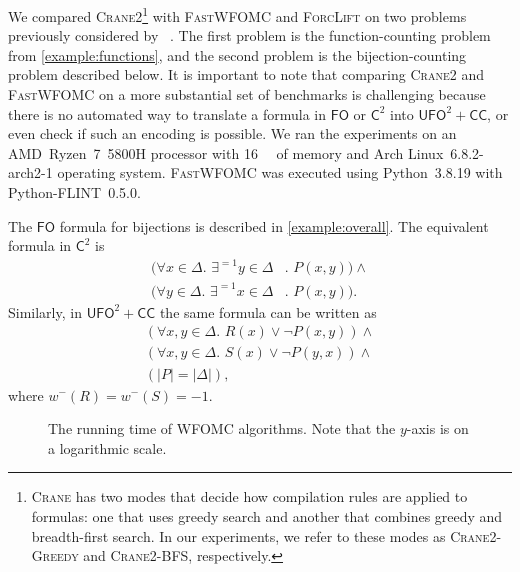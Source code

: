 \documentclass[letterpaper]{article} %
\theoremstyle{remark}
\theoremstyle{definition}
\newcommand{\Ctwo}{$\mathsf{C}^{2}$}
\newcommand{\FO}{$\mathsf{FO}$}
\newcommand{\UFO}{$\mathsf{UFO}^{2} + \mathsf{CC}$}
\newcommand{\Cranetwo}{\textsc{Crane2}}
\newcommand{\Cranebfs}{\textsc{Crane2-BFS}}
\newcommand{\Cranegreedy}{\textsc{Crane2-Greedy}}
\begin{document}
We compared \Cranetwo{}\footnote{\textsc{Crane} has two modes that decide how
  compilation rules are applied to formulas: one that uses greedy search and
  another that combines greedy and breadth-first search. In our experiments, we
  refer to these modes as \Cranegreedy{} and \Cranebfs{}, respectively.} with
\textsc{FastWFOMC} and \textsc{ForcLift} on two problems previously considered
by \citeauthor{DBLP:conf/kr/DilkasB23}~. The
first problem is the function-counting problem from \cref{example:functions},
and the second problem is the bijection-counting problem described below. It is
important to note that comparing \Cranetwo{} and \textsc{FastWFOMC} on a more
substantial set of benchmarks is challenging because there is no automated way
to translate a formula in \FO{} or \Ctwo{} into \UFO{}, or even check if such an
encoding is possible. We ran the experiments on an AMD~Ryzen~7~5800H processor
with \SI{16}{\gibi\byte} of memory and Arch Linux~6.8.2-arch2-1 operating
system. \textsc{FastWFOMC} was executed using Python~3.8.19 with
Python-FLINT~0.5.0.

The \FO{} formula for bijections is described in \cref{example:overall}. The
equivalent formula in \Ctwo{} is
\begin{align*}
  (\forall x \in \Delta\text{. }\exists^{=1} y \in \Delta&\text{. }P(x, y))\land{}\\
  (\forall y \in \Delta\text{. }\exists^{=1} x \in \Delta&\text{. }P(x, y)).
\end{align*}
Similarly, in \UFO{} the same formula can be written as
\begin{gather*}
  (\forall x, y \in \Delta\text{. }R(x) \lor \neg P(x, y))\land{}\\
  (\forall x, y \in \Delta\text{. }S(x) \lor \neg P(y, x))\land{}\\
  (|P| = |\Delta|),
\end{gather*}
where $w^{-}(R) = w^{-}(S) = -1$.

\begin{figure}[t]
  \centering
  
  \caption{The running time of WFOMC algorithms. Note that the $y$-axis is on a
    logarithmic scale.}\label{fig:plot}
\end{figure}


\end{document}
